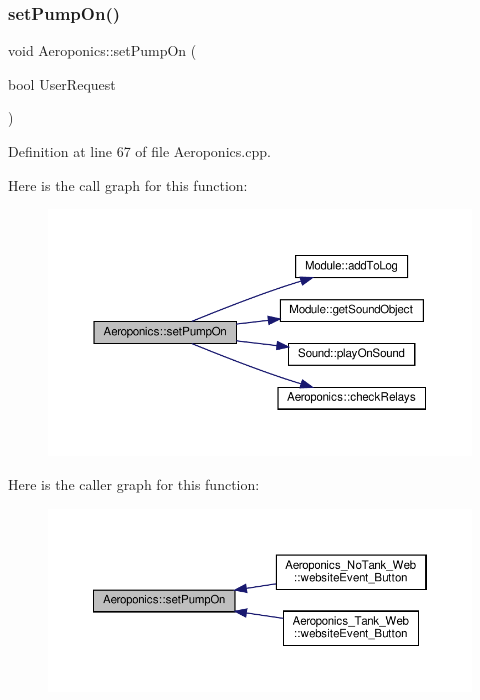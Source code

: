 \mbox{\label{class_aeroponics_ae4d0324ae9193294ed4a1ca5ab247537}} 
\subsubsection{\texorpdfstring{set\+Pump\+On()}{setPumpOn()}\hspace{0.1cm}{\footnotesize\ttfamily [2/2]}}
{\footnotesize\ttfamily void Aeroponics\+::set\+Pump\+On (\begin{DoxyParamCaption}\item[{bool}]{User\+Request }\end{DoxyParamCaption})\hspace{0.3cm}{\ttfamily [protected]}}



Definition at line 67 of file Aeroponics.\+cpp.

Here is the call graph for this function\+:
\nopagebreak
\begin{figure}[H]
\begin{center}
\leavevmode
\includegraphics[width=350pt]{class_aeroponics_ae4d0324ae9193294ed4a1ca5ab247537_cgraph}
\end{center}
\end{figure}
Here is the caller graph for this function\+:
\nopagebreak
\begin{figure}[H]
\begin{center}
\leavevmode
\includegraphics[width=350pt]{class_aeroponics_ae4d0324ae9193294ed4a1ca5ab247537_icgraph}
\end{center}
\end{figure}
\mbox{\label{class_aeroponics_ac0363ff5470e85f5acda1842a616dd41}} 
